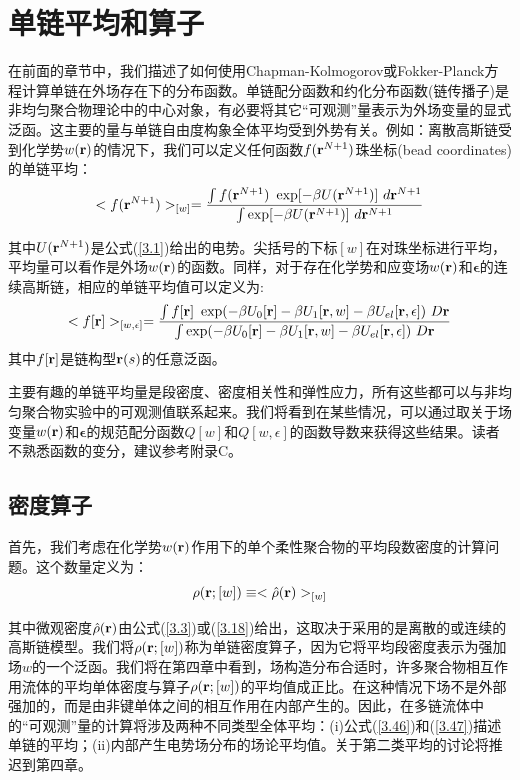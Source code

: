 \section{单链平均和算子}

在前面的章节中，我们描述了如何使用Chapman-Kolmogorov或Fokker-Planck方程计算单链在外场存在下的分布函数。单链配分函数和约化分布函数(链传播子)是非均匀聚合物理论中的中心对象，有必要将其它“可观测”量表示为外场变量的显式泛函。这主要的量与单链自由度构象全体平均受到外势有关。例如：离散高斯链受到化学势$w (\mathbf{r})$的情况下，我们可以定义任何函数$f(\mathbf{r}^{N+1})$珠坐标(bead coordinates)的单链平均：
\begin{equation}\label{3.46}
<f(\mathbf{r}^{N+1})>_{[w]}= \frac{\int  f(\mathbf{r}^{N+1})~\exp[-\beta U(\mathbf{r}^{N+1})]~d \mathbf{r}^{N+1}}{\int \exp[-\beta U(\mathbf{r}^{N+1})]~d\mathbf{r}^{N+1}}
\end{equation}

其中$U(\mathbf{r}^{N+1})$是公式(\ref{3.1})给出的电势。尖括号的下标$[w]$在对珠坐标进行平均，平均量可以看作是外场$w(\mathbf{r})$的函数。同样，对于存在化学势和应变场$w(\mathbf{r})$和$\mathbf{\epsilon}$的连续高斯链，相应的单链平均值可以定义为:
\begin{equation}\label{3.47}
<f[\mathbf{r}]>_{[w ,\epsilon]}=\frac{\int f[\mathbf{r}]~\exp(-\beta U_{0}[\mathbf{r}]-\beta U_{1}[\mathbf{r},w]-\beta U_{el}[\mathbf{r},\epsilon])~D\mathbf{r}}{\int \exp(-\beta U_{0}[\mathbf{r}]-\beta U_{1}[\mathbf{r},w]-\beta U_{el}[\mathbf{r},\epsilon])~D\mathbf{r}}
\end{equation}
其中$f[\mathbf{r}]$是链构型$\mathbf{r}(s)$的任意泛函。

主要有趣的单链平均量是段密度、密度相关性和弹性应力，所有这些都可以与非均匀聚合物实验中的可观测值联系起来。我们将看到在某些情况，可以通过取关于场变量$w(\mathbf{r})$和$\mathbf{\epsilon}$的规范配分函数$Q[w]$和$Q[w,\epsilon]$的函数导数来获得这些结果。读者不熟悉函数的变分，建议参考附录C。
\subsection{密度算子}
首先，我们考虑在化学势$w(\mathbf{r})$作用下的单个柔性聚合物的平均段数密度的计算问题。这个数量定义为：
\begin{equation}\label{3.48}
\rho(\mathbf{r};[w])\equiv<\hat{\rho}(\mathbf{r})>_{[w]}
\end{equation}

其中微观密度$\hat{\rho}(\mathbf{r})$由公式(\ref{3.3})或(\ref{3.18})给出，这取决于采用的是离散的或连续的高斯链模型。我们将$\rho(\mathbf{r};[w])$称为单链密度算子，因为它将平均段密度表示为强加场$w$的一个泛函。我们将在第四章中看到，场构造分布合适时，许多聚合物相互作用流体的平均单体密度与算子$\rho(\mathbf{r};[w])$的平均值成正比。在这种情况下场不是外部强加的，而是由非键单体之间的相互作用在内部产生的。因此，在多链流体中的“可观测”量的计算将涉及两种不同类型全体平均：(i)公式(\ref{3.46})和(\ref{3.47})描述单链的平均；(ii)内部产生电势场分布的场论平均值。关于第二类平均的讨论将推迟到第四章。

